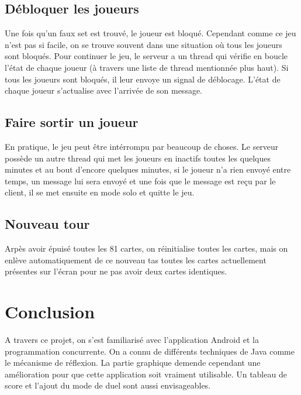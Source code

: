 \documentclass[paper=a4, french]{scrartcl} %
\begin{document}
\subsection{Débloquer les joueurs}
Une fois qu'un faux set est trouvé, le joueur est bloqué. Cependant comme ce jeu n'est pas si facile, on se trouve souvent dans une situation où tous les joueurs sont bloqués. Pour continuer le jeu, le serveur a un thread qui vérifie en boucle l'état de chaque joueur (à travers une liste de thread mentionnée plus haut). Si tous les joueurs sont bloqués, il leur envoye un signal de déblocage. L'état de chaque joueur s'actualise avec l'arrivée de son message.

\subsection{Faire sortir un joueur}
En pratique, le jeu peut être intérrompu par beaucoup de choses. Le serveur possède un autre thread qui met les joueurs en inactifs toutes les quelques minutes et au bout d'encore quelques minutes, si le joueur n'a rien envoyé entre temps, un message lui sera envoyé et une fois que le message est reçu par le client, il se met ensuite en mode solo et quitte le jeu.

\subsection{Nouveau tour}
Arpès avoir épuisé toutes les 81 cartes, on réinitialise toutes les cartes, mais on enlève automatiquement de ce nouveau tas toutes les cartes actuellement présentes sur l'écran pour ne pas avoir deux cartes identiques.



\section{Conclusion}


A travers ce projet, on s'est familiarisé avec l'application Android et la programmation concurrente. On a connu de différents techniques de Java comme le mécanisme de réflexion. La partie graphique demende cependant une amélioration pour que cette application soit vraiment utilisable. Un tableau de score et l'ajout du mode de duel sont aussi envisageables.

\end{document}
